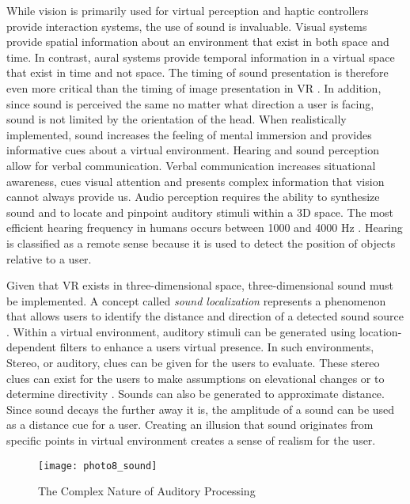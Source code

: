 While vision is primarily used for virtual perception and haptic controllers provide interaction systems, the use of sound is invaluable. Visual systems provide spatial information about an environment that exist in both space and time. In contrast, aural systems provide temporal information in a virtual space that exist in time and not space. The timing of sound presentation is therefore even more critical than the timing of image presentation in VR \cite{mihelj_haptics}. In addition, since sound is perceived the same no matter what direction a user is facing, sound is not limited by the orientation of the head. When realistically implemented, sound increases the feeling of mental immersion and provides informative cues about a virtual environment. Hearing and sound perception allow for verbal communication. Verbal communication increases situational awareness, cues visual attention and presents complex information that vision cannot always provide us. Audio perception requires the ability to synthesize sound and to locate and pinpoint auditory stimuli within a 3D space. The most efficient hearing frequency in humans occurs between 1000 and 4000 Hz \cite{gobbetti}.%
Hearing is classified as a remote sense because it is used to detect the position of objects relative to a user. 


\par Given that VR exists in three-dimensional space, three-dimensional sound must be implemented. A concept called \textit{sound localization} represents a phenomenon that allows users to identify the distance and direction of a detected sound source \cite{mihelj_haptics}.  Within a virtual environment, auditory stimuli can be generated using location-dependent filters to enhance a users virtual presence. In such environments, Stereo, or auditory, clues can be given for the users to evaluate. These stereo clues can exist for the users to make assumptions on elevational changes or to determine directivity \cite{gobbetti}. Sounds can also be generated to approximate distance. Since sound decays the further away it is, the amplitude of a sound can be used as a distance cue for a user. Creating an illusion that sound originates from specific points in virtual environment creates a sense of realism for the user. 

\begin{figure}[h]
	\centering
	\texttt{[image: photo8\_sound]}
	\caption{The Complex Nature of Auditory Processing \cite{sound}}
	\label{fig:soundPerception}
\end{figure}

